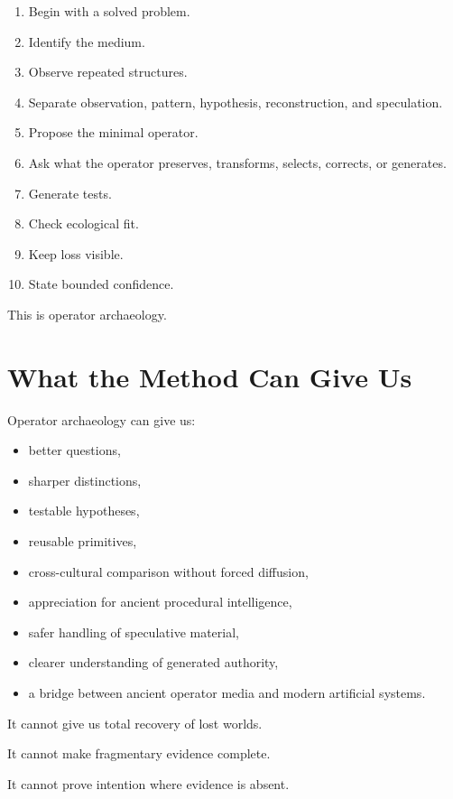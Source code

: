 \documentclass[11pt]{book}
\begin{document}
\begin{enumerate}[label=\arabic*.]
    \item Begin with a solved problem.
    \item Identify the medium.
    \item Observe repeated structures.
    \item Separate observation, pattern, hypothesis, reconstruction, and speculation.
    \item Propose the minimal operator.
    \item Ask what the operator preserves, transforms, selects, corrects, or generates.
    \item Generate tests.
    \item Check ecological fit.
    \item Keep loss visible.
    \item State bounded confidence.
\end{enumerate}

This is operator archaeology.

\section{What the Method Can Give Us}

Operator archaeology can give us:

\begin{itemize}
    \item better questions,
    \item sharper distinctions,
    \item testable hypotheses,
    \item reusable primitives,
    \item cross-cultural comparison without forced diffusion,
    \item appreciation for ancient procedural intelligence,
    \item safer handling of speculative material,
    \item clearer understanding of generated authority,
    \item a bridge between ancient operator media and modern artificial systems.
\end{itemize}

It cannot give us total recovery of lost worlds.

It cannot make fragmentary evidence complete.

It cannot prove intention where evidence is absent.
\end{document}
